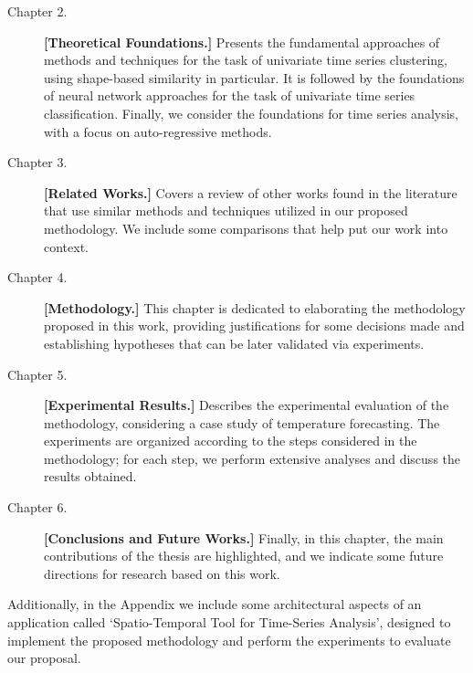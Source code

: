 \begin{description}
\item[Chapter 2.] \textbf{[Theoretical Foundations.]} Presents the fundamental approaches of methods and techniques for the task of univariate time series clustering, using shape-based similarity in particular. It is followed by the foundations of neural network approaches for the task of univariate time series classification. Finally, we consider the foundations for time series analysis, with a focus on auto-regressive methods.

\item[Chapter 3.] \textbf{[Related Works.]} Covers a review of other works found in the literature that use similar methods and techniques utilized in our proposed methodology. We include some comparisons that help put our work into context. 

\item[Chapter 4.] \textbf{[Methodology.]} This chapter is dedicated to elaborating the methodology proposed in this work, providing justifications for some decisions made and establishing hypotheses that can be later validated via experiments.


\item[Chapter 5.] \textbf{[Experimental Results.]} Describes the experimental evaluation of the methodology, considering a case study of temperature forecasting. The experiments are organized according to the steps considered in the methodology; for each step, we perform extensive analyses and discuss the results obtained. 

\item[Chapter 6.] \textbf{[Conclusions and Future Works.]} Finally, in this chapter, the main contributions of the thesis are highlighted, and we indicate some future directions for research based on this work.

\end{description}

Additionally, in the Appendix we include some architectural aspects of an application called `Spatio-Temporal Tool for Time-Series Analysis', designed to implement the proposed methodology and perform the experiments to evaluate our proposal.